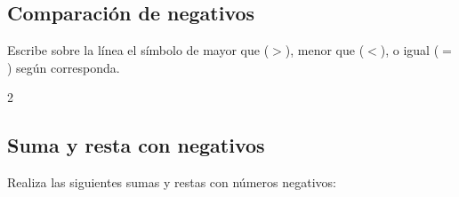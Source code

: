 \documentclass[12pt,examen,answers]{repaso_layout}
\begin{document}
\begin{questions}
	\subsection{Comparación de negativos}

      \question[6] Escribe sobre la línea el símbolo de mayor que ($>$), menor que ($<$), o igual ($=$) según corresponda.

      \begin{multicols}{2}
      \end{multicols}

      \newpage
	\subsection{Suma y resta con negativos}

      \question[4] Realiza las siguientes sumas y restas con números negativos:


\end{questions}
\end{document}
